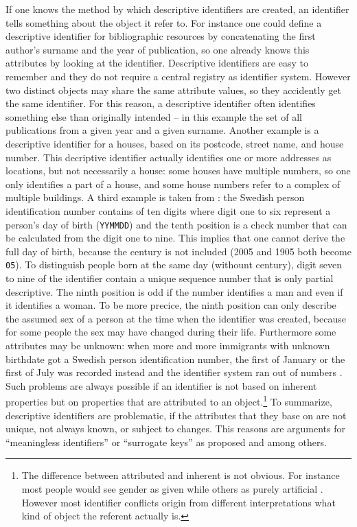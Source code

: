 If one knows the method by which descriptive identifiers are created, an
identifier tells something about the object it refer to. For instance
one could define a descriptive identifier for bibliographic resources by
concatenating the first author's surname and the year of publication, so
one already knows this attributes by looking at the identifier. Descriptive
identifiers are easy to remember and they do not require a central registry
as identifier system. However two distinct objects may share the same 
attribute values, so they accidently get the same 
identifier. For this reason, a descriptive identifier often identifies 
something else than originally intended -- in this example the set of all
publications from a given year and a given surname. Another example is a
descriptive identifier for a houses, based on its postcode, street name, 
and house number. This decriptive identifier actually identifies one or
more addresses as locations, but not necessarily a house: some houses have 
multiple numbers, so one only identifies a part of a house, and some house numbers
refer to a complex of multiple buildings. \label{ex:housenum} 
A third example is taken from
\textcite{Eriksson2010}: the Swedish person identification number contains 
of ten digits where digit one to six represent a person's day of birth 
(\texttt{YYMMDD}) and the tenth position is a check number that can be 
calculated from the digit one to nine. This implies that one cannot derive
the full day of birth, because the century is not included (2005 and 1905 
both become \texttt{05}). To distinguish people born at the same day 
(withount century), digit seven to nine of the identifier contain a 
unique sequence number that is only partial descriptive. The ninth position
is odd if the number identifies a man and even if it identifies a woman.
To be more precice, the ninth position can only describe the assumed sex
of a person at the time when the identifier was created, because for some 
people the sex may have changed during their life. Furthermore some attributes
may be unknown: when more and more immigrants with unknown birthdate got a 
Swedish person identification number, the first of January or the first of
July was recorded instead and the identifier system ran out of numbers
\cite{Eriksson2010}. Such problems are always possible if an identifier is
not based on inherent properties but on properties that are attributed to an
object.\footnote{The difference between attributed and inherent is not obvious.
For instance most people would see gender as given while others as purely 
artificial \cite{Butler1990}. However most identifier conflicts origin from
different interpretations what kind of object the referent actually is.}
To summarize, descriptive identifiers are 
problematic, if the attributes that they base on are not unique, not always
known, or subject to changes. This reasons are arguments for ``meaningless
identifiers'' or ``surrogate keys'' as proposed \textcite{Kimball1998}
and \textcite{Wieringa1991} among others.

